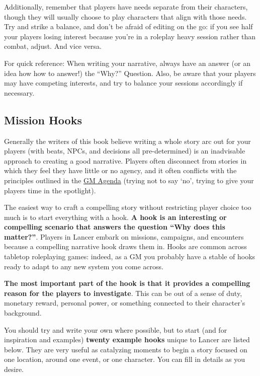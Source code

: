 Additionally, remember that players have needs separate from their characters, though they will
usually choose to play characters that align with those needs. Try and strike a balance, and don’t
be afraid of editing on the go: if you see half your players losing interest because you’re in a
roleplay heavy session rather than combat, adjust. And vice versa.

For quick reference: When writing your narrative, always have an answer (or an idea how how to
answer!) the “Why?” Question. Also, be aware that your players may have competing interests,
and try to balance your sessions accordingly if necessary.

\subsection{Mission Hooks}

Generally the writers of this book believe writing a whole story arc out for your players (with
beats, NPCs, and decisions all pre-determined) is an inadvisable approach to creating a good
narrative. Players often disconnect from stories in which they feel they have little or no agency,
and it often conflicts with the principles outlined in the \hyperlink{GMAgenda}{GM Agenda} (trying not to say ‘no’, trying
to give your players time in the spotlight).


The easiest way to craft a compelling story without restricting player choice too much is to start
everything with a hook. \textbf{A hook is an interesting or compelling scenario that answers the
question “Why does this matter?”}. Players in Lancer embark on missions, campaigns, and
encounters because a compelling narrative hook draws them in. Hooks are common across
tabletop roleplaying games: indeed, as a GM you probably have a stable of hooks ready to adapt
to any new system you come across.


\textbf{The most important part of the hook is that it provides a compelling reason for the players
to investigate}. This can be out of a sense of duty, monetary reward, personal power, or
something connected to their character’s background.


You should try and write your own where possible, but to start (and for inspiration and examples)
\textbf{twenty example hooks} unique to Lancer are listed below. They are very useful as catalyzing
moments to begin a story focused on one location, around one event, or one character. You can
fill in details as you desire.


